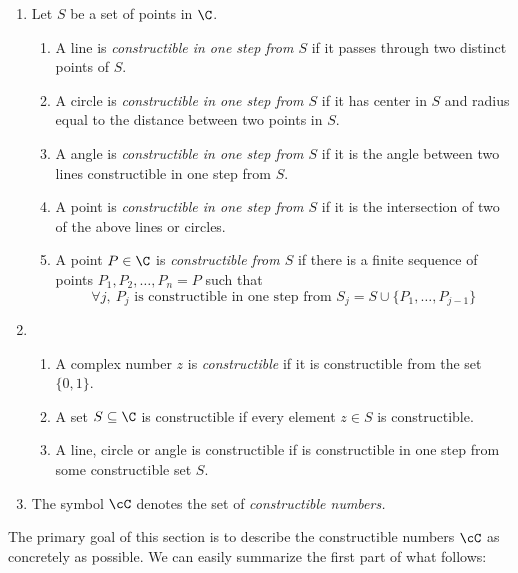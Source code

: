 \begin{defn}
\begin{enumerate}
  \item Let $S$ be a set of points in $\C$.
  \begin{enumerate}
		\item A line is \emph{constructible in one step from $S$} if it passes through 
two distinct points of $S$.
		\item A circle is \emph{constructible in one step from $S$} if it has center in $S$ 
and radius equal to the distance between two points in $S$.
		\item A angle is \emph{constructible in one step from $S$} if it is the angle between two lines constructible in one step from $S$.
		\item A point is \emph{constructible in one step from $S$} if it is the intersection of two of the above lines or circles.
		\item A point $P\in\C$ is \emph{constructible from $S$} if there is a finite sequence of points $P_1,P_2,\ldots,P_n=P$ such that
		\[\forall j,\ P_j\text{ is constructible in one step from }S_j=S\cup \{P_1,\ldots,P_{j-1}\}\]
	\end{enumerate}
	\item\begin{enumerate}
	  \item A complex number $z$ is \emph{constructible} if it is constructible from the set $\{0,1\}$.
		\item A set $S\subseteq\C$ is constructible if every element $z\in S$ is constructible.
		\item A line, circle or angle is constructible if is constructible in one step from some constructible set $S$.
	\end{enumerate}
	\item The symbol $\cC$ denotes the set of \emph{constructible numbers.}
\end{enumerate}
\end{defn}

The primary goal of this section is to describe the constructible numbers $\cC$ as concretely as possible. We can easily summarize the first part of what follows: 

